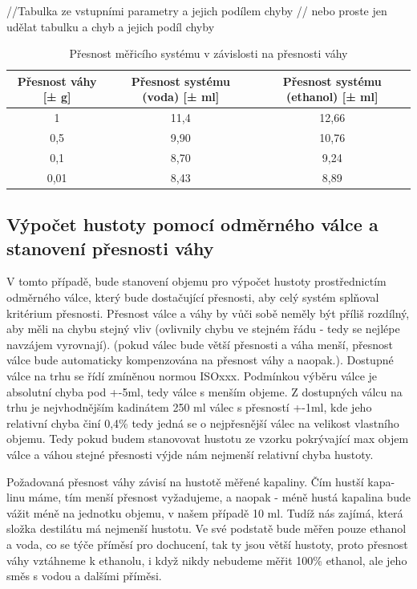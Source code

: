 //Tabulka ze vstupními parametry a jejich podílem chyby
// nebo proste jen udělat tabulku a chyb a jejich podíl chyby

\begin{table}
    \centering
    \begin{tabular}{|c|c|c|}
        \hline
        Přesnost váhy [± g] & Přesnost systému (voda) [± ml] & Přesnost systému (ethanol) [± ml]\\ \hline \hline
         1 & 11,4 & 12,66\\ \hline
         0,5 & 9,90 & 10,76\\ \hline
         0,1 & 8,70 & 9,24\\ \hline
         0,01 & 8,43 & 8,89\\ \hline
    \end{tabular}
    \caption{Přesnost měřicího systému v závislosti na přesnosti váhy}
    \label{tab:my_label}
\end{table}

\subsection{Výpočet hustoty pomocí odměrného válce a stanovení přesnosti váhy}

V tomto případě, bude stanovení objemu pro výpočet hustoty prostřednictím odměrného válce, který bude dostačující přesnosti, aby celý systém splňoval kritérium přesnosti. Přesnost válce a váhy by vůči sobě neměly být příliš rozdílný, aby měli na chybu stejný vliv (ovlivnily chybu ve stejném řádu - tedy se nejlépe navzájem vyrovnají). (pokud válec bude větší přesnosti a váha menší, přesnost válce bude automaticky kompenzována na přesnost váhy a naopak.). Dostupné válce na trhu se řídí zmíněnou normou ISOxxx. Podmínkou výběru válce je absolutní chyba pod +-5ml, tedy válce s menším objeme. Z dostupných válcu na trhu je nejvhodnějším kadinátem 250 ml válec s přesností +-1ml, kde jeho relativní chyba činí 0,4\% tedy jedná se o nejpřesnější válec na velikost vlastního objemu. Tedy pokud budem stanovovat hustotu ze vzorku pokrývající max objem válce a váhou stejné přesnosti výjde nám nejmenší relativní chyba hustoty.

Požadovaná přesnost váhy závisí na hustotě měřené kapaliny. Čím hustší kapa-
linu máme, tím menší přesnost vyžadujeme, a naopak - méně hustá kapalina bude
vážit méně na jednotku objemu, v našem případě 10 ml. Tudíž nás zajímá, která
složka destilátu má nejmenší hustotu. Ve své podstatě bude měřen pouze ethanol
a voda, co se týče příměsí pro dochucení, tak ty jsou větší hustoty, proto přesnost váhy vztáhneme k ethanolu, i když nikdy nebudeme měřit 100\% ethanol, ale jeho směs s vodou a dalšími příměsi.

